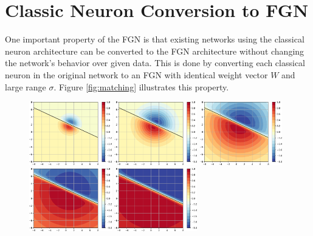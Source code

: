 \documentclass[12pt,oneside]{CUNY_PhD}
\begin{document}
\section{Classic Neuron Conversion to FGN}
One important property of the FGN is that existing networks using the classical neuron architecture can be converted to the FGN architecture without changing the network's behavior over given data. This is done by converting each classical neuron in the original network to an FGN with identical weight vector $W$ and large range $\sigma$. Figure \ref{fig:matching} illustrates this property.
\begin{figure}[!htbp]
    \centering
    \includegraphics[width=0.32\textwidth]{images/Matching-behavior/sigma-2-cropped.png}
    \includegraphics[width=0.32\textwidth]{images/Matching-behavior/sigma-3-cropped.png}
    \includegraphics[width=0.32\textwidth]{images/Matching-behavior/sigma-4-cropped.png}
    \includegraphics[width=0.32\textwidth]{images/Matching-behavior/sigma-5-cropped.png}
    \includegraphics[width=0.32\textwidth]{images/Matching-behavior/sigma-6-cropped.png}

\end{figure}
\end{document}
